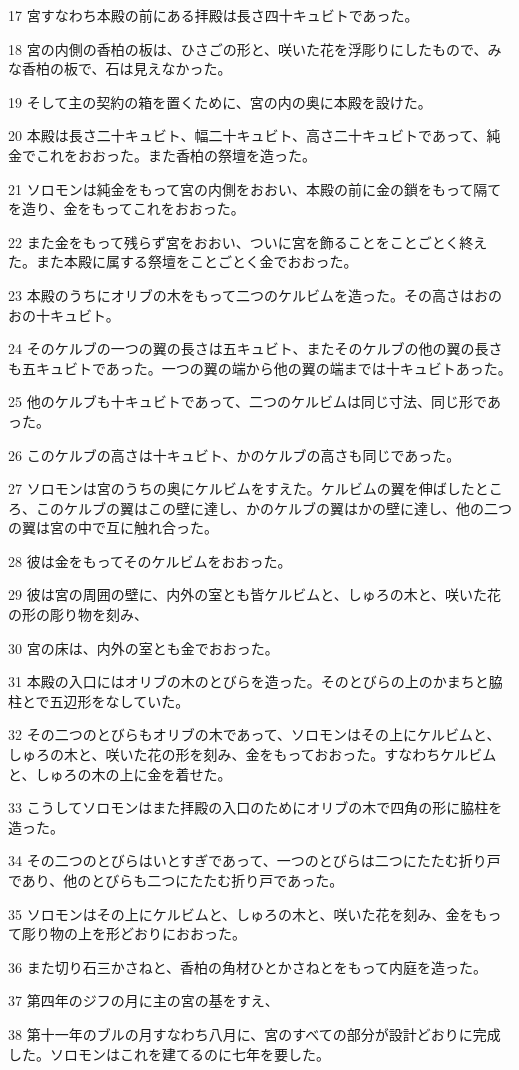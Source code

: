 \par 17 宮すなわち本殿の前にある拝殿は長さ四十キュビトであった。
\par 18 宮の内側の香柏の板は、ひさごの形と、咲いた花を浮彫りにしたもので、みな香柏の板で、石は見えなかった。
\par 19 そして主の契約の箱を置くために、宮の内の奥に本殿を設けた。
\par 20 本殿は長さ二十キュビト、幅二十キュビト、高さ二十キュビトであって、純金でこれをおおった。また香柏の祭壇を造った。
\par 21 ソロモンは純金をもって宮の内側をおおい、本殿の前に金の鎖をもって隔てを造り、金をもってこれをおおった。
\par 22 また金をもって残らず宮をおおい、ついに宮を飾ることをことごとく終えた。また本殿に属する祭壇をことごとく金でおおった。
\par 23 本殿のうちにオリブの木をもって二つのケルビムを造った。その高さはおのおの十キュビト。
\par 24 そのケルブの一つの翼の長さは五キュビト、またそのケルブの他の翼の長さも五キュビトであった。一つの翼の端から他の翼の端までは十キュビトあった。
\par 25 他のケルブも十キュビトであって、二つのケルビムは同じ寸法、同じ形であった。
\par 26 このケルブの高さは十キュビト、かのケルブの高さも同じであった。
\par 27 ソロモンは宮のうちの奥にケルビムをすえた。ケルビムの翼を伸ばしたところ、このケルブの翼はこの壁に達し、かのケルブの翼はかの壁に達し、他の二つの翼は宮の中で互に触れ合った。
\par 28 彼は金をもってそのケルビムをおおった。
\par 29 彼は宮の周囲の壁に、内外の室とも皆ケルビムと、しゅろの木と、咲いた花の形の彫り物を刻み、
\par 30 宮の床は、内外の室とも金でおおった。
\par 31 本殿の入口にはオリブの木のとびらを造った。そのとびらの上のかまちと脇柱とで五辺形をなしていた。
\par 32 その二つのとびらもオリブの木であって、ソロモンはその上にケルビムと、しゅろの木と、咲いた花の形を刻み、金をもっておおった。すなわちケルビムと、しゅろの木の上に金を着せた。
\par 33 こうしてソロモンはまた拝殿の入口のためにオリブの木で四角の形に脇柱を造った。
\par 34 その二つのとびらはいとすぎであって、一つのとびらは二つにたたむ折り戸であり、他のとびらも二つにたたむ折り戸であった。
\par 35 ソロモンはその上にケルビムと、しゅろの木と、咲いた花を刻み、金をもって彫り物の上を形どおりにおおった。
\par 36 また切り石三かさねと、香柏の角材ひとかさねとをもって内庭を造った。
\par 37 第四年のジフの月に主の宮の基をすえ、
\par 38 第十一年のブルの月すなわち八月に、宮のすべての部分が設計どおりに完成した。ソロモンはこれを建てるのに七年を要した。

